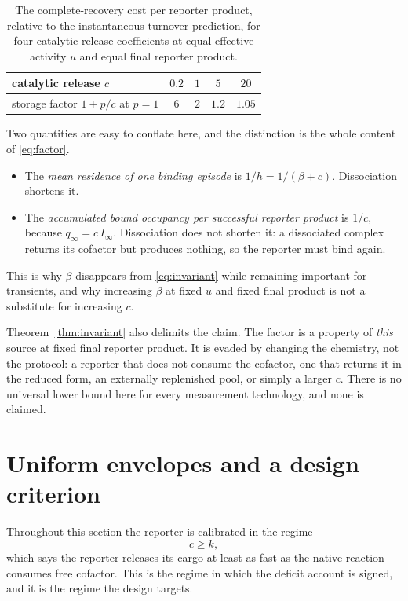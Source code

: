 \documentclass[11pt]{article}
\theoremstyle{definition}
\theoremstyle{remark}
\begin{document}
\begin{table}[ht]
\centering\small
\begin{tabular}{lcccc}
\toprule
catalytic release $c$ & $0.2$ & $1$ & $5$ & $20$\\
\midrule
storage factor $1+p/c$ at $p=1$ & $6$ & $2$ & $1.2$ & $1.05$\\
\bottomrule
\end{tabular}
\caption{The complete-recovery cost per reporter product, relative to the
instantaneous-turnover prediction, for four catalytic release coefficients at
equal effective activity $u$ and equal final reporter product.}
\label{tab:factor}
\end{table}

Two quantities are easy to conflate here, and the distinction is the whole
content of \eqref{eq:factor}.
\begin{itemize}
\item The \emph{mean residence of one binding episode} is $1/h=1/(\beta+c)$.
Dissociation shortens it.
\item The \emph{accumulated bound occupancy per successful reporter product} is
$1/c$, because $q_\infty=c\,I_\infty$. Dissociation does not shorten it: a
dissociated complex returns its cofactor but produces nothing, so the reporter
must bind again.
\end{itemize}
This is why $\beta$ disappears from \eqref{eq:invariant} while remaining
important for transients, and why increasing $\beta$ at fixed $u$ and fixed
final product is not a substitute for increasing $c$.

Theorem~\ref{thm:invariant} also delimits the claim. The factor is a property of
\emph{this} source at fixed final reporter product. It is evaded by changing the
chemistry, not the protocol: a reporter that does not consume the cofactor, one
that returns it in the reduced form, an externally replenished pool, or simply a
larger $c$. There is no universal lower bound here for every measurement
technology, and none is claimed.

\section{Uniform envelopes and a design criterion}
\label{sec:envelopes}

Throughout this section the reporter is calibrated in the regime
\begin{equation}
c\ge k,
\label{eq:regime}
\end{equation}
which says the reporter releases its cargo at least as fast as the native
reaction consumes free cofactor. This is the regime in which the deficit account
is signed, and it is the regime the design targets.
\end{document}
